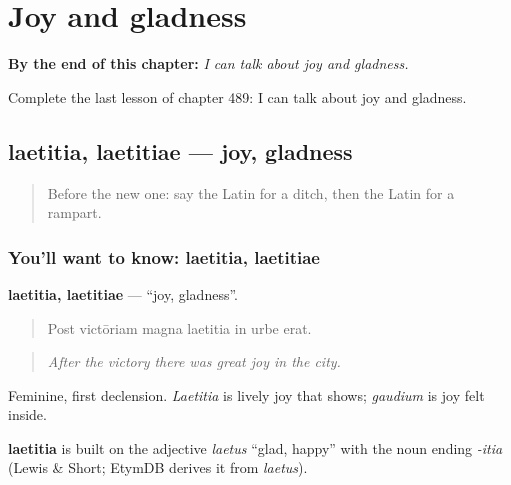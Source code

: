 
\chapter{Joy and gladness}
\label{ch:la-joy-and-gladness}

\begin{chapteropening}
\textbf{By the end of this chapter:} \emph{I can talk about joy and gladness.}

Complete the last lesson of chapter 489: I can talk about joy and gladness.
\end{chapteropening}

\section[laetitia, laetitiae]{laetitia, laetitiae — joy, gladness}

\label{lesson:LA-C489-laetitia}



\begin{quote}
Before the new one: say the Latin for a ditch, then the Latin for a rampart.
\end{quote}

\subsection*{You'll want to know: laetitia, laetitiae}
\textbf{laetitia, laetitiae} — \textquotedblleft{}joy, gladness\textquotedblright{}.

\begin{quote}
Post victōriam magna laetitia in urbe erat.
\end{quote}

\begin{quote}
\emph{After the victory there was great joy in the city.}
\end{quote}

Feminine, first declension. \emph{Laetitia} is lively joy that shows; \emph{gaudium} is joy felt inside.

\begin{cousinweb}
\textbf{laetitia} is built on the adjective \emph{laetus} \textquotedblleft{}glad, happy\textquotedblright{} with the noun ending \emph{-itia} (Lewis \& Short; EtymDB derives it from \emph{laetus}).
\end{cousinweb}

